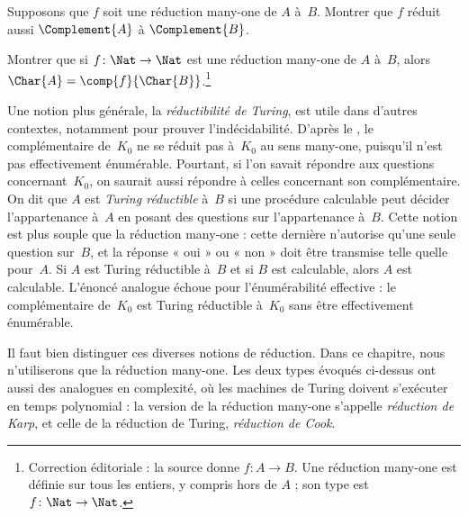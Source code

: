 \documentclass[../../../include/open-logic-section]{subfiles}
\begin{document}
\begin{prob}
Supposons que $f$ soit une réduction many-one
de $A$ à~$B$. Montrer que $f$ réduit aussi
$\Complement{A}$ à $\Complement{B}$.
\end{prob}

\begin{prob}
Montrer que si $f\colon\Nat\to\Nat$ est une
réduction many-one de $A$ à~$B$, alors
$\Char{A}=\comp{f}{\Char{B}}$.\footnote{Correction éditoriale : la source donne $f\colon A\to B$. Une réduction many-one est définie sur tous les entiers, y compris hors de $A$ ; son type est $f\colon\Nat\to\Nat$.}
\end{prob}

\begin{digress}
Une notion plus générale, la \emph{réductibilité
de Turing}, est utile dans d'autres contextes,
notamment pour prouver l'indécidabilité. D'après le
, le complémentaire
de~$K_0$ ne se réduit pas à~$K_0$ au sens
many-one, puisqu'il n'est pas effectivement
énumérable. Pourtant, si l'on savait répondre
aux questions concernant~$K_0$, on saurait
aussi répondre à celles concernant son
complémentaire. On dit que $A$ est \emph{Turing
réductible} à~$B$ si une procédure calculable
peut décider l'appartenance à~$A$ en posant des
questions sur l'appartenance à~$B$. Cette notion
est plus souple que la réduction many-one :
cette dernière n'autorise qu'une seule question
sur~$B$, et la réponse « oui » ou « non » doit
être transmise telle quelle pour~$A$.
Si $A$ est Turing réductible à~$B$ et si $B$
est calculable, alors $A$ est calculable.
L'énoncé analogue échoue pour l'énumérabilité
effective : le complémentaire de~$K_0$ est
Turing réductible à~$K_0$ sans être
effectivement énumérable.

Il faut bien distinguer ces diverses notions
de réduction. Dans ce chapitre, nous n'utiliserons
que la réduction many-one. Les deux types évoqués
ci-dessus ont aussi des analogues en complexité,
où les machines de Turing doivent s'exécuter en
temps polynomial : la version de la réduction
many-one s'appelle \emph{réduction de Karp},
et celle de la réduction de Turing,
\emph{réduction de Cook}.
\end{digress}
\end{document}
